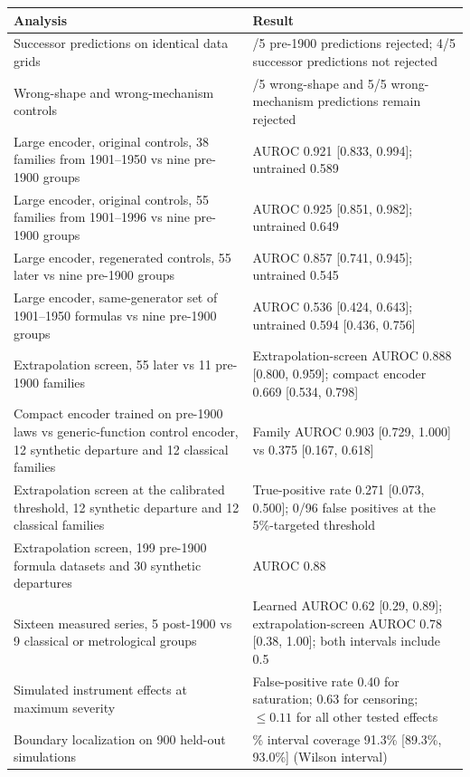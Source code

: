 \documentclass{article}
\begin{document}
\begin{table}[htbp]
\begin{tabular}{@{}>{\raggedright\arraybackslash}p{}
                  >{\raggedright\arraybackslash}p{}@{}}
\toprule
Analysis & Result \\
\midrule
Successor predictions on identical data grids &
5/5 pre-1900 predictions rejected; 4/5 successor predictions not rejected \\
Wrong-shape and wrong-mechanism controls &
5/5 wrong-shape and 5/5 wrong-mechanism predictions remain rejected \\
Large encoder, original controls, 38 families from 1901--1950 vs nine pre-1900
groups &
AUROC 0.921 [0.833, 0.994]; untrained 0.589 \\
Large encoder, original controls, 55 families from 1901--1996 vs nine pre-1900
groups &
AUROC 0.925 [0.851, 0.982]; untrained 0.649 \\
Large encoder, regenerated controls, 55 later vs nine pre-1900 groups &
AUROC 0.857 [0.741, 0.945]; untrained 0.545 \\
Large encoder, same-generator set of 1901--1950 formulas vs nine
pre-1900 groups &
AUROC 0.536 [0.424, 0.643]; untrained 0.594 [0.436, 0.756] \\
Extrapolation screen, 55 later vs 11 pre-1900 families &
Extrapolation-screen AUROC 0.888 [0.800, 0.959]; compact encoder 0.669 [0.534, 0.798] \\
Compact encoder trained on pre-1900 laws vs generic-function control encoder,
12 synthetic departure and 12 classical families &
Family AUROC 0.903 [0.729, 1.000] vs 0.375 [0.167, 0.618] \\
Extrapolation screen at the calibrated threshold, 12 synthetic departure and 12 classical
families &
True-positive rate 0.271 [0.073, 0.500]; 0/96 false positives at the
5\%-targeted threshold \\
Extrapolation screen, 199 pre-1900 formula datasets and 30 synthetic departures &
AUROC 0.88 \\
Sixteen measured series, 5 post-1900 vs 9 classical or
metrological groups &
Learned AUROC 0.62 [0.29, 0.89]; extrapolation-screen AUROC 0.78 [0.38, 1.00]; both
intervals include 0.5 \\
Simulated instrument effects at maximum severity &
False-positive rate 0.40 for saturation; 0.63 for censoring; $\leq 0.11$ for all
other tested effects \\
Boundary localization on 900 held-out simulations &
90\% interval coverage 91.3\% [89.3\%, 93.0\%] (Wilson interval) \\
\bottomrule
\end{tabular}
\end{table}
\end{document}
